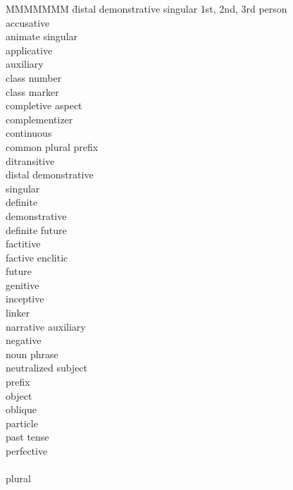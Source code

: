\documentclass[output=paper,colorlinks,citecolor=brown]{langscibook}
\begin{document}
\begin{multicols}{2}
\begin{tabbing}
MMMMMMM \= distal demonstrative singular \kill
{} \> 1st, 2nd, 3rd person \\
 \>	accusative \\
 \>animate singular\\
 \>applicative\\
 \>	auxiliary\\
 \>	class number\\
 \>class marker\\
 \>completive aspect\\
 \>	complementizer\\
 \>continuous\\
 \>common plural prefix\\
 \>ditransitive\\
 \>distal demonstrative \\
				\> singular\\
 \>definite\\
 \>demonstrative\\
 \>definite future\\
 \>factitive\\
 \>factive enclitic\\
 \>future\\
 \>genitive\\
 \> inceptive\\
 \>linker\\
 \>narrative auxiliary\\
 \>negative\\
 \>noun  phrase\\
 \>neutralized subject\\
			  \> prefix\\
\>	object\\
\>	oblique\\
\>	particle\\
\>	past tense\\
  \>perfective\\
 \> \\
 \>plural\\

\end{tabbing}
\end{multicols}
\end{document}

